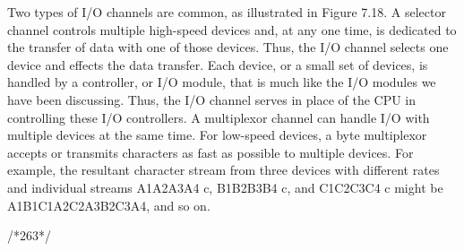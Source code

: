 	Two types of I/O channels are common, as illustrated in Figure 7.18. A
	selector channel controls multiple high-speed devices and, at any one time, is
	dedicated to the transfer of data with one of those devices. Thus, the I/O channel
	selects one device and effects the data transfer. Each device, or a small set of
	devices, is handled by a controller, or I/O module, that is much like the I/O modules
	we have been discussing. Thus, the I/O channel serves in place of the CPU
	in controlling these I/O controllers. A multiplexor channel can handle I/O with
	multiple devices at the same time. For low-speed devices, a byte multiplexor
	accepts or transmits characters as fast as possible to multiple devices. For example,
	the resultant character stream from three devices with different rates and individual
	streams A1A2A3A4 c, B1B2B3B4 c, and C1C2C3C4 c might be A1B1C1A2C2A3B2C3A4, and so on.
	

	/*263*/
